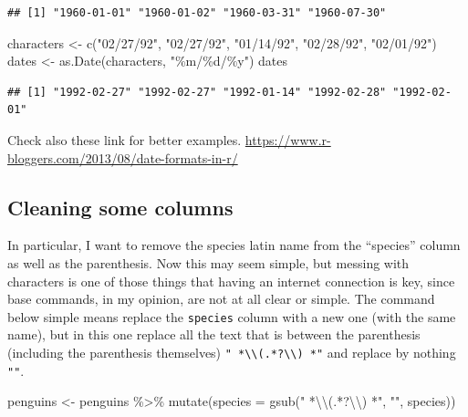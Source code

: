 \documentclass[
]{book}
\newenvironment{Shaded}{\begin{snugshade}}{\end{snugshade}}
\newcommand{\AttributeTok}[1]{\textcolor[rgb]{0.77,0.63,0.00}{#1}}
\newcommand{\FunctionTok}[1]{\textcolor[rgb]{0.00,0.00,0.00}{#1}}
\newcommand{\NormalTok}[1]{#1}
\newcommand{\OtherTok}[1]{\textcolor[rgb]{0.56,0.35,0.01}{#1}}
\newcommand{\SpecialCharTok}[1]{\textcolor[rgb]{0.00,0.00,0.00}{#1}}
\newcommand{\StringTok}[1]{\textcolor[rgb]{0.31,0.60,0.02}{#1}}
\begin{document}
\begin{verbatim}
## [1] "1960-01-01" "1960-01-02" "1960-03-31" "1960-07-30"
\end{verbatim}

\begin{Shaded}
\begin{Highlighting}[]
\NormalTok{characters }\OtherTok{\textless{}{-}} \FunctionTok{c}\NormalTok{(}\StringTok{"02/27/92"}\NormalTok{, }\StringTok{"02/27/92"}\NormalTok{, }\StringTok{"01/14/92"}\NormalTok{, }\StringTok{"02/28/92"}\NormalTok{, }\StringTok{"02/01/92"}\NormalTok{)}
\NormalTok{dates }\OtherTok{\textless{}{-}} \FunctionTok{as.Date}\NormalTok{(characters, }\StringTok{"\%m/\%d/\%y"}\NormalTok{)}
\NormalTok{dates}
\end{Highlighting}
\end{Shaded}

\begin{verbatim}
## [1] "1992-02-27" "1992-02-27" "1992-01-14" "1992-02-28" "1992-02-01"
\end{verbatim}

Check also these link for better examples.
\url{https://www.r-bloggers.com/2013/08/date-formats-in-r/}

\hypertarget{cleaning-some-columns}{%
\subsection{Cleaning some columns}\label{cleaning-some-columns}}

In particular, I want to remove the species latin name from the ``species'' column as well as the parenthesis.
Now this may seem simple, but messing with characters is one of those things that having an internet connection is key, since base commands, in my opinion, are not at all clear or simple.
The command below simple means replace the \texttt{species} column with a new one (with the same name), but in this one replace all the text that is between the parenthesis (including the parenthesis themselves) \texttt{"\ *\textbackslash{}\textbackslash{}(.*?\textbackslash{}\textbackslash{})\ *"} and replace by nothing \texttt{""}.

\begin{Shaded}
\begin{Highlighting}[]
\NormalTok{penguins }\OtherTok{\textless{}{-}}\NormalTok{ penguins }\SpecialCharTok{\%\textgreater{}\%} 
  \FunctionTok{mutate}\NormalTok{(}\AttributeTok{species =} \FunctionTok{gsub}\NormalTok{(}\StringTok{" *}\SpecialCharTok{\textbackslash{}\textbackslash{}}\StringTok{(.*?}\SpecialCharTok{\textbackslash{}\textbackslash{}}\StringTok{) *"}\NormalTok{, }\StringTok{""}\NormalTok{, species))}
\end{Highlighting}
\end{Shaded}
\end{document}

